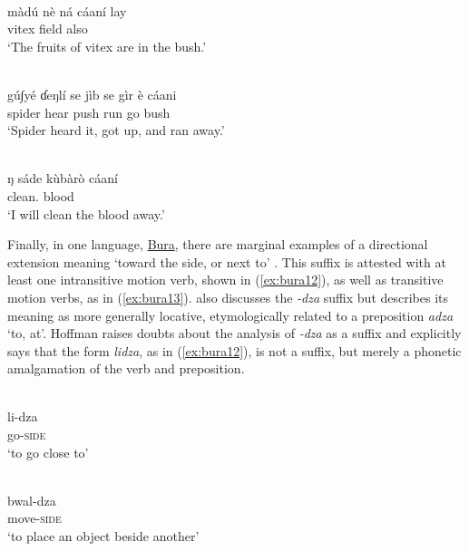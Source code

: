 \ea\label{ex:lele7}
 \\
\gll màdú	nè	ná	cáaní	lay \\
vitex			field	also \\
\glt `The fruits of vitex are in the bush.'

\ex\label{ex:lele0}
 \\
\gll gú∫yé ɗeŋlí se jìb se gìr è cáani	\\
spider hear  push  run go bush\\
\glt `Spider heard it, got up, and ran away.'

\ex\label{ex:lele9}
 \\
\gll ŋ	sáde	kùbàrò	cáaní \\
	clean.	blood	 \\
\glt `I will clean the blood away.'
\z 

Finally, in one language, \hyperref[bura]{Bura}, there are marginal examples of a directional extension meaning `toward the side, or next to' \citep{blenchBuraVerbalExtensions2010}. This suffix is attested with at least one intransitive motion verb, shown in (\ref{ex:bura12}), as well as transitive motion verbs, as in (\ref{ex:bura13}). \citet[275]{hoffmannUntersuchungenZurStruktur1955} also discusses the \textit{-dza} suffix but describes its meaning as more generally locative, etymologically related to a preposition \textit{adza} `to, at'. Hoffman raises doubts about the analysis of \textit{-dza} as a suffix and explicitly says that the form \textit{lidza}, as in (\ref{ex:bura12}), is not a suffix, but merely a phonetic amalgamation of the verb and preposition. 

\ea\label{ex:bura12}
 \\
\gll li-dza \\
go-\textsc{side} \\
\glt `to go close to'

\ex\label{ex:bura13}
 \\
\gll bwal-dza \\
move-\textsc{side} \\
\glt `to place an object beside another'
\z 


